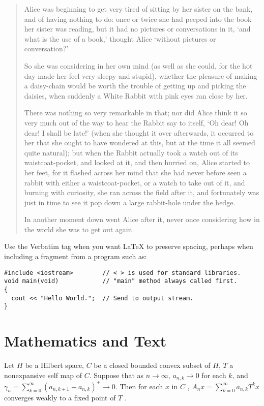 \documentclass{article}
\begin{document}
\begin{quotation}
Alice was beginning to get very tired of sitting by her sister on the bank,
and of having nothing to do: once or twice she had peeped into the book her
sister was reading, but it had no pictures or conversations in it, `and what
is the use of a book,' thought Alice `without pictures or conversation?'

So she was considering in her own mind (as well as she could, for the hot
day made her feel very sleepy and stupid), whether the pleasure of making a
daisy-chain would be worth the trouble of getting up and picking the
daisies, when suddenly a White Rabbit with pink eyes ran close by her.

There was nothing so very remarkable in that; nor did Alice think it so very
much out of the way to hear the Rabbit say to itself, `Oh dear! Oh dear! I
shall be late!' (when she thought it over afterwards, it occurred to her
that she ought to have wondered at this, but at the time it all seemed quite
natural); but when the Rabbit actually took a watch out of its
waistcoat-pocket, and looked at it, and then hurried on, Alice started to
her feet, for it flashed across her mind that she had never before seen a
rabbit with either a waistcoat-pocket, or a watch to take out of it, and
burning with curiosity, she ran across the field after it, and fortunately
was just in time to see it pop down a large rabbit-hole under the hedge.

In another moment down went Alice after it, never once considering how in
the world she was to get out again.
\end{quotation}

Use the Verbatim tag when you want \LaTeX{} to preserve spacing, perhaps
when including a fragment from a program such as:
\begin{verbatim}
#include <iostream>        // < > is used for standard libraries.
void main(void)            // "main" method always called first.
{
  cout << "Hello World.";  // Send to output stream.
}
\end{verbatim}

\section{Mathematics and Text}

Let $H$ be a Hilbert space, $C$ be a closed bounded convex subset of $H$, $T$
a nonexpansive self map of $C$. Suppose that as $n\rightarrow \infty $, $%
a_{n,k}\rightarrow 0$ for each $k$, and $\gamma _{n}=\sum_{k=0}^{\infty
}\left( a_{n,k+1}-a_{n,k}\right) ^{+}\rightarrow 0$. Then for each $x$ in $C$%
, $A_{n}x=\sum_{k=0}^{\infty }a_{n,k}T^{k}x$ converges weakly to a fixed
point of $T$ .
\end{document}
